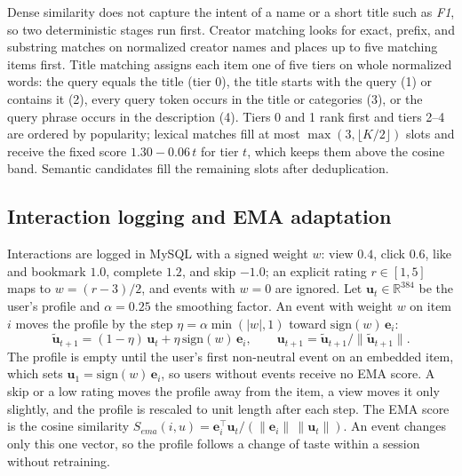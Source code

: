 \documentclass[3p,times,procedia]{elsarticle}
\begin{document}
Dense similarity does not capture the intent of a name or a short title such as \emph{F1}, so two deterministic stages run first. Creator matching looks for exact, prefix, and substring matches on normalized creator names and places up to five matching items first. Title matching assigns each item one of five tiers on whole normalized words: the query equals the title (tier 0), the title starts with the query (1) or contains it (2), every query token occurs in the title or categories (3), or the query phrase occurs in the description (4). Tiers 0 and 1 rank first and tiers 2--4 are ordered by popularity; lexical matches fill at most $\max(3,\lfloor K/2\rfloor)$ slots and receive the fixed score $1.30-0.06\,t$ for tier $t$, which keeps them above the cosine band. Semantic candidates fill the remaining slots after deduplication.

\subsection{Interaction logging and EMA adaptation}
\label{sec:ema}
Interactions are logged in MySQL with a signed weight $w$: view $0.4$, click $0.6$, like and bookmark $1.0$, complete $1.2$, and skip $-1.0$; an explicit rating $r\in[1,5]$ maps to $w=(r-3)/2$, and events with $w=0$ are ignored. Let $\mathbf{u}_t\in\mathbb{R}^{384}$ be the user's profile and $\alpha=0.25$ the smoothing factor. An event with weight $w$ on item $i$ moves the profile by the step $\eta=\alpha\min(|w|,1)$ toward $\mathrm{sign}(w)\,\mathbf{e}_i$:
\begin{equation}
    \tilde{\mathbf{u}}_{t+1}=(1-\eta)\,\mathbf{u}_t+\eta\,\mathrm{sign}(w)\,\mathbf{e}_i,
    \qquad
    \mathbf{u}_{t+1}=\tilde{\mathbf{u}}_{t+1}/\|\tilde{\mathbf{u}}_{t+1}\|.
    \label{eq:ema_update}
\end{equation}
The profile is empty until the user's first non-neutral event on an embedded item, which sets $\mathbf{u}_1=\mathrm{sign}(w)\,\mathbf{e}_i$, so users without events receive no EMA score. A skip or a low rating moves the profile away from the item, a view moves it only slightly, and the profile is rescaled to unit length after each step. The EMA score is the cosine similarity $S_{\mathit{ema}}(i,u)=\mathbf{e}_i^\top\mathbf{u}_t/(\|\mathbf{e}_i\|\,\|\mathbf{u}_t\|)$. An event changes only this one vector, so the profile follows a change of taste within a session without retraining.
\end{document}
